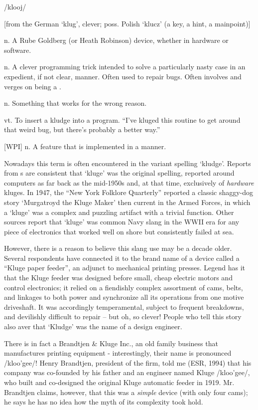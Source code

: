  /klooj/

[from the German `klug', clever; poss. Polish `klucz' (a key, a hint, a mainpoint)]
\begin{inparaenum}
	\item n. A Rube Goldberg (or Heath Robinson) device, whether in hardware or software.
	\item n. A clever programming trick intended to solve a particularly nasty case in an expedient, if not clear, manner. Often used to repair bugs. Often involves  and verges on being a .
	\item n. Something that works for the wrong reason.
	\item vt. To insert a kludge into a program. ``I've kluged this routine to get around that weird bug, but there's probably a better way.''
	\item {[}WPI]  n. A feature that is implemented in a  manner.
\end{inparaenum}

Nowadays this term is often encountered in the variant spelling `kludge'. Reports from s are consistent that `kluge' was the original spelling, reported around computers as far back as the mid-1950s and, at that time, exclusively of \textit{hardware} kluges. In 1947, the ``New York Folklore Quarterly'' reported a classic shaggy-dog story `Murgatroyd the Kluge Maker' then current in the Armed Forces, in which a `kluge' was a complex and puzzling artifact with a trivial function. Other sources report that `kluge' was common Navy slang in the WWII era for any piece of electronics that worked well on shore but consistently failed at sea.

However, there is a reason to believe this slang use may be a decade older. Several respondents have connected it to the brand name of a device called a ``Kluge paper feeder'', an adjunct to mechanical printing presses. Legend has it that the Kluge feeder was designed before small, cheap electric motors and control electronics; it relied on a fiendishly complex assortment of cams, belts, and linkages to both power and synchronize all its operations from one motive driveshaft. It was accordingly temperamental, subject to frequent breakdowns, and devilishly difficult to repair -- but oh, so clever! People who tell this story also aver that `Kludge' was the name of a design engineer.

There is in fact a Brandtjen \& Kluge Inc., an old family business that manufactures printing equipment - interestingly, their name is pronounced /kloo'gee/! Henry Brandtjen, president of the firm, told me (ESR, 1994) that his company was co-founded by his father and an engineer named Kluge /kloo'gee/, who built and co-designed the original Kluge automatic feeder in 1919. Mr. Brandtjen claims, however, that this was a \textit{simple} device (with only four cams); he says he has no idea how the myth of its complexity took hold.

